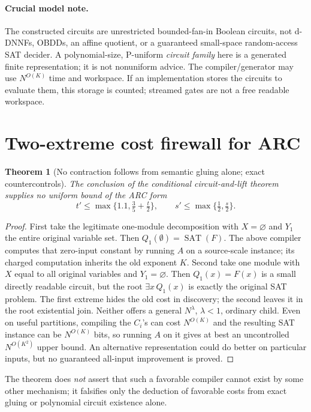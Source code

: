 \documentclass[11pt]{article}
\newtheorem{theorem}{Theorem}
\newcommand{\SAT}{\operatorname{SAT}}
\begin{document}
\paragraph{Crucial model note.}
The constructed circuits are unrestricted bounded-fan-in Boolean circuits, not d-DNNFs, OBDDs, an affine quotient, or a guaranteed small-space random-access SAT decider. A polynomial-size, P-uniform \emph{circuit family} here is a generated finite representation; it is not nonuniform advice. The compiler/generator may use \(N^{O(K)}\) time and workspace. If an implementation stores the circuits to evaluate them, this storage is counted; streamed gates are not a free readable workspace.

\section{Two-extreme cost firewall for ARC}
\begin{theorem}[No contraction follows from semantic gluing alone; exact countercontrols]
The conclusion of the conditional circuit-and-lift theorem supplies no uniform bound of the ARC form
\[
t'\le\max\{1.1,\tfrac35+\tfrac t2\},\qquad
s'\le\max\{\tfrac12,\tfrac s2\}.
\]
\end{theorem}
\begin{proof}
First take the legitimate one-module decomposition with \(X=\varnothing\) and \(Y_1\) the entire original variable set. Then \(Q_1(\emptyset)=\SAT(F)\). The above compiler computes that zero-input constant by running \(A\) on a source-scale instance; its charged computation inherits the old exponent \(K\). Second take one module with \(X\) equal to all original variables and \(Y_1=\varnothing\). Then \(Q_1(x)=F(x)\) is a small directly readable circuit, but the root \(\exists x\,Q_1(x)\) is exactly the original SAT problem. The first extreme hides the old cost in discovery; the second leaves it in the root existential join. Neither offers a general \(N^{\lambda}\), \(\lambda<1\), ordinary child. Even on useful partitions, compiling the \(C_i\)'s can cost \(N^{O(K)}\) and the resulting SAT instance can be \(N^{O(K)}\) bits, so running \(A\) on it gives at best an uncontrolled \(N^{O(K^2)}\) upper bound. An alternative representation could do better on particular inputs, but no guaranteed all-input improvement is proved.
\end{proof}
The theorem does \emph{not} assert that such a favorable compiler cannot exist by some other mechanism; it falsifies only the deduction of favorable costs from exact gluing or polynomial circuit existence alone.
\end{document}
